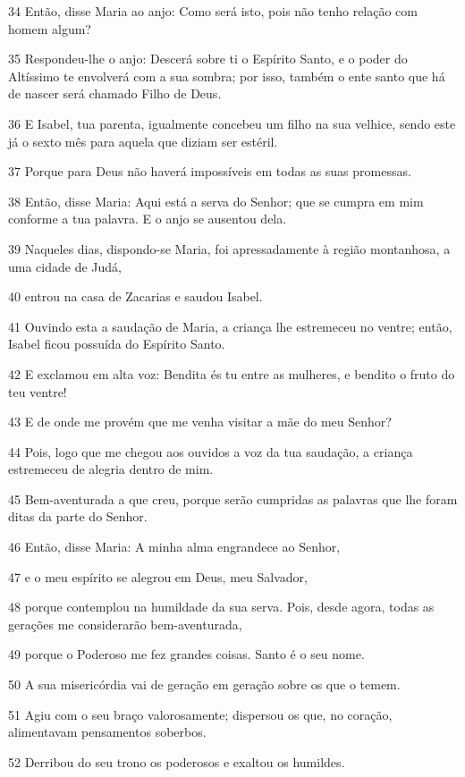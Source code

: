 \par 34 Então, disse Maria ao anjo: Como será isto, pois não tenho relação com homem algum?
\par 35 Respondeu-lhe o anjo: Descerá sobre ti o Espírito Santo, e o poder do Altíssimo te envolverá com a sua sombra; por isso, também o ente santo que há de nascer será chamado Filho de Deus.
\par 36 E Isabel, tua parenta, igualmente concebeu um filho na sua velhice, sendo este já o sexto mês para aquela que diziam ser estéril.
\par 37 Porque para Deus não haverá impossíveis em todas as suas promessas.
\par 38 Então, disse Maria: Aqui está a serva do Senhor; que se cumpra em mim conforme a tua palavra. E o anjo se ausentou dela.
\par 39 Naqueles dias, dispondo-se Maria, foi apressadamente à região montanhosa, a uma cidade de Judá,
\par 40 entrou na casa de Zacarias e saudou Isabel.
\par 41 Ouvindo esta a saudação de Maria, a criança lhe estremeceu no ventre; então, Isabel ficou possuída do Espírito Santo.
\par 42 E exclamou em alta voz: Bendita és tu entre as mulheres, e bendito o fruto do teu ventre!
\par 43 E de onde me provém que me venha visitar a mãe do meu Senhor?
\par 44 Pois, logo que me chegou aos ouvidos a voz da tua saudação, a criança estremeceu de alegria dentro de mim.
\par 45 Bem-aventurada a que creu, porque serão cumpridas as palavras que lhe foram ditas da parte do Senhor.
\par 46 Então, disse Maria: A minha alma engrandece ao Senhor,
\par 47 e o meu espírito se alegrou em Deus, meu Salvador,
\par 48 porque contemplou na humildade da sua serva. Pois, desde agora, todas as gerações me considerarão bem-aventurada,
\par 49 porque o Poderoso me fez grandes coisas. Santo é o seu nome.
\par 50 A sua misericórdia vai de geração em geração sobre os que o temem.
\par 51 Agiu com o seu braço valorosamente; dispersou os que, no coração, alimentavam pensamentos soberbos.
\par 52 Derribou do seu trono os poderosos e exaltou os humildes.
